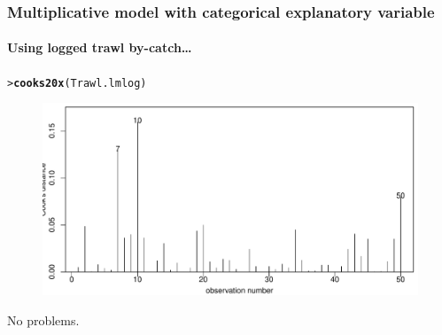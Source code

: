 \documentclass{beamer}\usepackage[]{graphicx}\usepackage[]{xcolor}
\makeatletter
\newcommand{\hlstd}[1]{\textcolor[rgb]{0.345,0.345,0.345}{#1}}%
\newcommand{\hlkwd}[1]{\textcolor[rgb]{0.737,0.353,0.396}{\textbf{#1}}}%
\newenvironment{kframe}{%
 \def\at@end@of@kframe{}%
 \ifinner\ifhmode%
  \def\at@end@of@kframe{\end{minipage}}%
  \begin{minipage}{\columnwidth}%
 \fi\fi%
 \def\FrameCommand##1{\hskip\@totalleftmargin \hskip-\fboxsep
 \colorbox{shadecolor}{##1}\hskip-\fboxsep
     \hskip-\linewidth \hskip-\@totalleftmargin \hskip\columnwidth}%
 \MakeFramed {\advance\hsize-\width
   \@totalleftmargin\z@ \linewidth\hsize
   \@setminipage}}%
 {\par\unskip\endMakeFramed%
 \at@end@of@kframe}
\newenvironment{knitrout}{}{} %
\makeatother
\begin{document}
\begin{frame}[fragile]
\frametitle{Multiplicative model with categorical explanatory variable}
\framesubtitle{Using logged trawl by-catch\ldots}
\begin{knitrout}\scriptsize
{}\color{fgcolor}\begin{kframe}
\begin{alltt}
\hlstd{> }\hlkwd{cooks20x}\hlstd{(Trawl.lmlog)}
\end{alltt}
\end{kframe}
\end{knitrout}



\begin{figure}
  \centering
  \includegraphics[scale=0.5]{figure/RC-H06-061}
\end{figure}

No problems. 
\end{frame}
\end{document}

